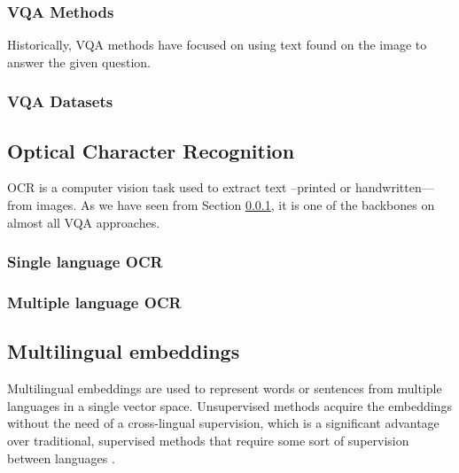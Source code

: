 \subsubsection{VQA Methods} 
\label{sota_vqa_methods}

Historically, VQA methods have focused on using text found on the image to answer the given question. 

\cite{vinyals2017pointer, DBLP:journals/corr/abs-1807-09956, singh2018pythia, Singh_2019_CVPR, 8978122, DBLP:journals/corr/abs-2006-00923, Hu_2020_CVPR}

\cite{pennington2014glove} %

\subsubsection{VQA Datasets}
\label{sota_vqa_datasets}

\cite{krishnavisualgenome, DBLP:journals/corr/VeitMNMB16, Johnson_2017_CVPR,Gurari_2018_CVPR, Biten_2019_ICCV, Singh_2019_CVPR}

\subsection{Optical Character Recognition}
\label{sota_ocr}

OCR is a computer vision task used to extract text –printed or handwritten–– from images. As we have seen from Section \ref{sota_vqa_methods}, it is one of the backbones on almost all VQA approaches.

\cite{wang2010word, mishra:hal-00818183}

\subsubsection{Single language OCR}
\label{sota_ocr_single_language}

\cite{}

\subsubsection{Multiple language OCR}
\label{sota_ocr_multiple_language}

\cite{borisyuk2018rosetta}

\subsection{Multilingual embeddings}
\label{sota_embeddings}
Multilingual embeddings are used to represent words or sentences from multiple languages in a single vector space.  Unsupervised methods acquire the embeddings without the need of a cross-lingual supervision, which is a significant advantage over traditional, supervised methods that require some sort of supervision between languages \cite{chen2018unsupervised}.

